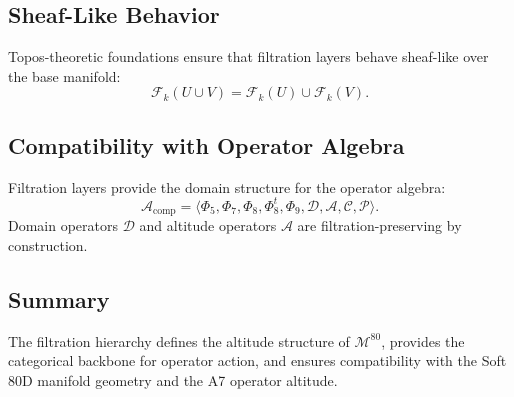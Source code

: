 \subsection{Sheaf-Like Behavior}
Topos-theoretic foundations  ensure that
filtration layers behave sheaf-like over the base manifold:
\[
\mathcal{F}_k(U \cup V) = \mathcal{F}_k(U) \cup \mathcal{F}_k(V).
\]

\subsection{Compatibility with Operator Algebra}
Filtration layers provide the domain structure for the operator algebra:
\[
\mathcal{A}_{\mathrm{comp}}
=
\langle
\Phi_5, \Phi_7, \Phi_8, \Phi_8^t, \Phi_9,
\mathcal{D}, \mathcal{A}, \mathcal{C}, \mathcal{P}
\rangle.
\]
Domain operators $\mathcal{D}$ and altitude operators $\mathcal{A}$ are
filtration-preserving by construction.

\subsection{Summary}
The filtration hierarchy defines the altitude structure of $\mathcal{M}^{80}$,
provides the categorical backbone for operator action, and ensures compatibility
with the Soft 80D manifold geometry and the A7 operator altitude.

